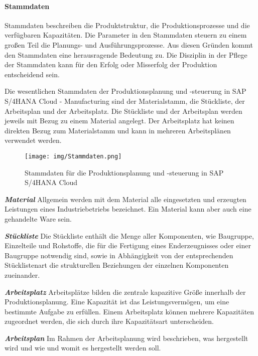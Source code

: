 \paragraph{Stammdaten}
Stammdaten beschreiben die Produktstruktur, die Produktionsprozesse und die verfügbaren Kapazitäten. Die Parameter in den Stammdaten steuern zu einem großen Teil die Planungs- und Ausführungsprozesse. Aus diesen Gründen kommt den Stammdaten eine herausragende Bedeutung zu. Die Disziplin in der Pflege der Stammdaten kann für den Erfolg oder Misserfolg der Produktion entscheidend sein.

Die wesentlichen Stammdaten der Produktionsplanung und -steuerung in SAP S/4HANA Cloud - Manufacturing sind der Materialstamm, die Stückliste, der Arbeitsplan und der Arbeitsplatz. Die Stückliste und der Arbeitsplan werden jeweils mit Bezug zu einem Material angelegt. Der Arbeitsplatz hat keinen direkten Bezug zum Materialstamm und kann in mehreren Arbeitsplänen verwendet werden.
\autocite{Dickersbach.2014}

\begin{figure}[H]
	\centering 
	\texttt{[image: img/Stammdaten.png]}
	\caption[Stammdaten für die Produktionsplanung und -steuerung in SAP S/4HANA Cloud]{\label{fig:stammdaten}Stammdaten für die Produktionsplanung und -steuerung in SAP S/4HANA Cloud 
		\autocite[In Anlehnung an][]{Dickersbach.2014}}
\end{figure}

\textbf{\textit{Material}}
Allgemein werden mit dem Material alle eingesetzten und erzeugten Leistungen eines Industriebetriebs bezeichnet. Ein Material kann aber auch eine gehandelte Ware sein.

\textbf{\textit{Stückliste}}
Die Stückliste enthält die Menge aller Komponenten, wie Baugruppe, Einzelteile und Rohstoffe, die für die Fertigung eines Enderzeugnisses oder einer Baugruppe notwendig sind, sowie in Abhängigkeit von der entsprechenden Stücklistenart die strukturellen Beziehungen der einzelnen Komponenten zueinander.

\textbf{\textit{Arbeitsplatz}}
Arbeitsplätze bilden die zentrale kapazitive Größe innerhalb der Produktionsplanung. Eine Kapazität ist das Leistungsvermögen, um eine bestimmte Aufgabe zu erfüllen. Einem Arbeitsplatz können mehrere Kapazitäten zugeordnet werden, die sich durch ihre Kapazitätsart unterscheiden.

\textbf{\textit{Arbeitsplan}}
Im Rahmen der Arbeitsplanung wird beschrieben, was hergestellt 
wird und wie und womit es hergestellt werden soll.
\autocite{Dickersbach.2014}

